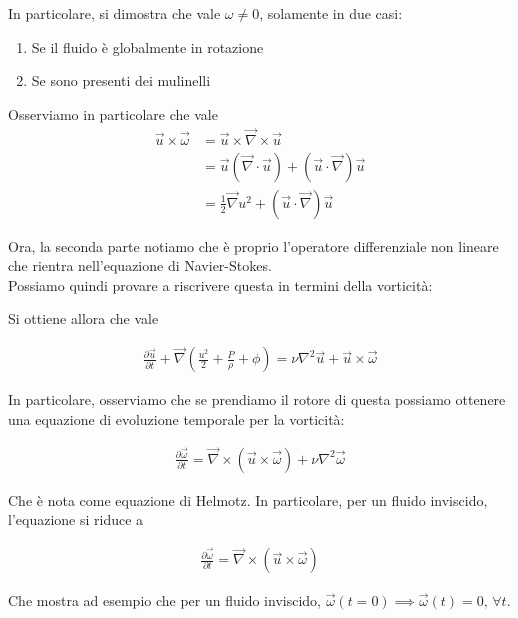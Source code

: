 \documentclass{report}
\begin{document}
In particolare, si dimostra che vale \(\omega \neq 0\), solamente in due casi: 
\begin{enumerate}
    \item Se il fluido è globalmente in rotazione
    \item Se sono presenti dei mulinelli
\end{enumerate}

Osserviamo in particolare che vale 
\begin{align}
    \vec{u}\times \vec{\omega} &= \vec{u}\times \vec{\nabla} \times \vec{u} \\
    &= \vec{u}(\vec{\nabla}\cdot \vec{u}) + (\vec{u}\cdot \vec{\nabla})\vec{u} \\
    &= \frac{1}{2}\vec{\nabla}u^2 + (\vec{u}\cdot \vec{\nabla})\vec{u}
\end{align}

Ora, la seconda parte notiamo che è proprio l'operatore differenziale non lineare che rientra nell'equazione di Navier-Stokes. \\

Possiamo quindi provare a riscrivere questa in termini della vorticità: 

Si ottiene allora che vale 

\begin{align}
    \frac{\partial \vec{u}}{\partial t} + \vec{\nabla}\left(\frac{u^2}{2} + \frac{P}{\rho} + \phi\right) = \nu \nabla^2\vec{u} + \vec{u}\times \vec{\omega}
\end{align}

In particolare, osserviamo che se prendiamo il rotore di questa possiamo ottenere una equazione di evoluzione temporale per la vorticità: 

\begin{tcolorbox}[colback=myg!15, colframe=black, boxrule=1pt]
\begin{align}
    \frac{\partial \vec{\omega}}{\partial t} = \vec{\nabla}\times(\vec{u}\times \vec{\omega}) + \nu \nabla^2\vec{\omega}
\end{align}
\end{tcolorbox}

Che è nota come equazione di Helmotz. In particolare, per un fluido inviscido, l'equazione si riduce a 

\begin{align}
    \frac{\partial \vec{\omega}}{\partial t} = \vec{\nabla}\times (\vec{u}\times \vec{\omega})
\end{align}

Che mostra ad esempio che per un fluido inviscido, \(\vec{\omega}(t=0) \implies \vec{\omega}(t)=0, \, \forall t\). 
\end{document}
